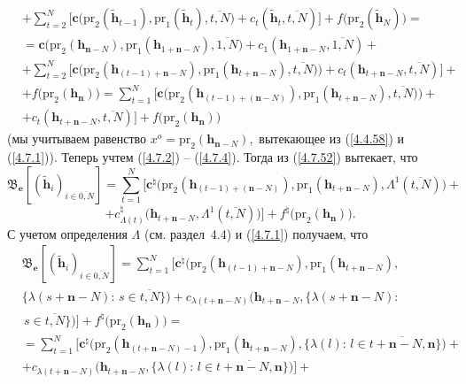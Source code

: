 \documentclass[11pt,twoside,openany]{report}
\newcommand{\ov}{\overline}
\newcommand{\La}{\Lambda}
\newcommand{\la}{\lambda}
\newcommand{\zc}{{\mathbf c}}
\newcommand{\nn}{{\mathbf n}}
\begin{document}
{{\begin{eqnarray}
&\nonumber\\
&+ \sum\limits_{t=2}^N\bigl[\zc\bigl(\mathrm{pr}_2(\tilde{\mathbf{h}}_{t-1}),\mathrm{pr}_1
(\tilde{\mathbf{h}}_t),\ov{t,N}\bigl) +
c_t(\tilde{\mathbf{h}}_t,\ov{t,N})\bigl] + f\bigl(\mathrm{pr}_2(\tilde{\mathbf{h}}_N)\bigl)=
&\nonumber\\
&=\zc\bigl(\mathrm{pr}_2(\mathbf{h}_{\nn-N}),\mathrm{pr}_1(\mathbf{h}_{1+\nn-N}),\ov{1,N}\bigl) +
c_1(\mathbf{h}_{1+\nn-N},\ov{1,N}) +
&\nonumber\\
&+\sum\limits_{t=2}^N\bigl[\zc\bigl(\mathrm{pr}_2(\mathbf{h}_{(t-1)+\nn-N}),\mathrm{pr}_1
(\mathbf{h}_{t+\nn-N}),\ov{t,N})\bigl) + c_t(\mathbf{h}_{t+\nn-N},\ov{t,N})\bigl]+
&\nonumber\\
&+f\bigl(\mathrm{pr}_2(\mathbf{h}_\nn)\bigl)=
\sum\limits_{t=1}^N\bigl[\zc\bigl(\mathrm{pr}_2(\mathbf{h}_{(t-1)+(\nn-N)}),\mathrm{pr}_1
(\mathbf{h}_{t+\nn-N}),\ov{t,N})\bigl) +
&\nonumber\\
&+c_t(\mathbf{h}_{t+\nn-N},\ov{t,N})\bigl]+
f\bigl(\mathrm{pr}_2(\mathbf{h}_\nn)\bigl)
&\label{4.7.52}
\end{eqnarray}
(мы учитываем равенство $x^o= \mathrm{pr}_2(\mathbf{h}_{\nn-N}),$ вытекающее из (\ref{4.4.58}) и
(\ref{4.7.1})). Теперь учтем (\ref{4.7.2}) -- (\ref{4.7.4}). Тогда из (\ref{4.7.52}) вытекает, что
$$\mathfrak{B}_\mathbf{e}[(\tilde{\mathbf{h}}_i)_{i\in\ov{0,N}}] =
\sum\limits_{t=1}^N\bigl[\zc^\natural\bigl(\mathrm{pr}_2(\mathbf{h}_{(t-1)+(\nn-N)}),\mathrm{pr}_1
(\mathbf{h}_{t+\nn-N}),\La^1(\ov{t,N})\bigl) +$$ $$+ c_{\La(t)}^{\natural}\bigl(\mathbf{h}_{t+\nn-N},
\La^1(\ov{t,N})\bigl)\bigl]+ f^\natural\bigl(\mathrm{pr}_2(\mathbf{h}_\nn)\bigl).
$$
С учетом определения $\La$ (см. раздел~4.4) и (\ref{4.7.1}) получаем, что
\begin{eqnarray}
&\mathfrak{B}_\mathbf{e}[(\tilde{\mathbf{h}}_i)_{i\in\ov{0,N}}] =
\sum\limits_{t=1}^N\bigl[\zc^\natural\bigl(\mathrm{pr}_2(\mathbf{h}_{(t-1)+\nn-N}),\mathrm{pr}_1
(\mathbf{h}_{t+\nn-N}),
&\nonumber\\
&\{\la(s+\nn-N):\,s\in\ov{t,N}\}\bigl) + c_{\la(t+\nn-N)}\bigl(\mathbf{h}_{t+\nn-N},\{\la(s+\nn-N):
&\nonumber\\
&\,s\in\ov{t,N}\}\bigl)\bigl]+
f^\natural\bigl(\mathrm{pr}_2(\mathbf{h}_\nn)\bigl)=
&\nonumber\\
&= \sum\limits_{t=1}^N\bigl[\zc^\natural\bigl(\mathrm{pr}_2(\mathbf{h}_{(t+\nn-N)-1}),\mathrm{pr}_1
(\mathbf{h}_{t+\nn-N}),\{\la(l):\,l\in\ov{t+\nn-N,\nn}\}\bigl)+
&\nonumber\\
&+c_{\la(t+\nn-N)}\bigl(\mathbf{h}_{t+\nn-N},\{\la(l):\,l\in \ov{t+\nn-N,\nn}\}\bigl)\bigl]+

\end{eqnarray}}}
\end{document}
